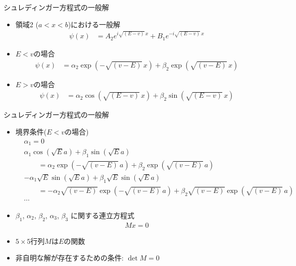 \begin{frame}[t,fragile]{シュレディンガー方程式の一般解}
  \begin{itemize}
  \item 領域2 ($a < x < b$)における一般解
    \begin{align*}
      \psi(x) &= A_2 e^{i\sqrt{(E-v)}\,x} + B_1 e^{-i\sqrt{(E-v)}\,x}
    \end{align*}
  \item $E < v$の場合
    \begin{align*}
      \psi(x) &= \alpha_2 \exp(-\sqrt{(v-E)}\,x) + \beta_2 \exp(\sqrt{(v-E)}\,x)
    \end{align*}
  \item $E > v$の場合
    \begin{align*}
      \psi(x) &= \alpha_2 \cos(\sqrt{(E-v)}\,x) + \beta_2 \sin(\sqrt{(E-v)}\,x)
    \end{align*}
  \end{itemize}
\end{frame}

\begin{frame}[t,fragile]{シュレディンガー方程式の一般解}
  \begin{itemize}
  \item 境界条件($E < v$の場合)
    \begin{align*}
      &\alpha_1 = 0 \\
      &\alpha_1 \cos(\sqrt{E}a) + \beta_1 \sin(\sqrt{E}a) \\
      & \qquad =
      \alpha_2 \exp(-\sqrt{(v-E)}\,a) + \beta_2 \exp(\sqrt{(v-E)}\,a) \\
      &-\alpha_1 \sqrt{E} \sin(\sqrt{E}a) + \beta_1 \sqrt{E} \sin(\sqrt{E}a) \\
      & \qquad =
      - \alpha_2 \sqrt{(v-E)} \exp(-\sqrt{(v-E)}\,a) + \beta_2 \sqrt{(v-E)} \exp(\sqrt{(v-E)}\,a) \\
      &\cdots
    \end{align*}
  \item $\beta_1$, $\alpha_2$, $\beta_2$, $\alpha_3$, $\beta_3$ に関する連立方程式
    \begin{align*}
      M x = 0
    \end{align*}
  \item $5 \times 5$行列$M$は$E$の関数
  \item 非自明な解が存在するための条件: $\det M=0$
  \end{itemize}
\end{frame}
